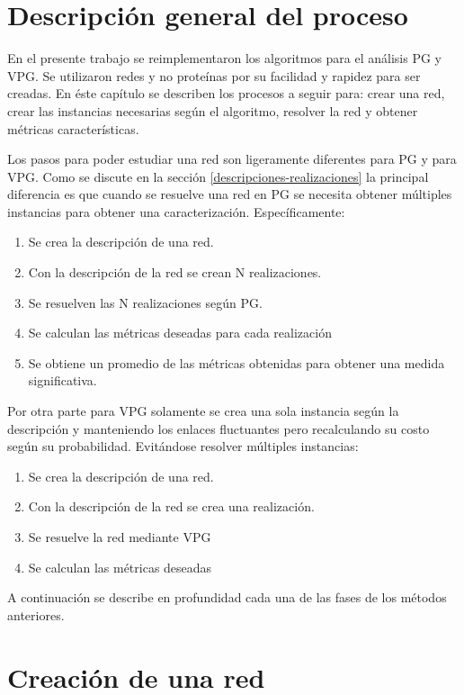 \section{Descripción general del proceso} \label{seccion-descripcion}
En el presente trabajo se reimplementaron los algoritmos para el análisis PG y VPG. Se utilizaron redes y no proteínas por su facilidad y rapidez para ser creadas. En éste capítulo se describen los procesos a seguir para: crear una red, crear las instancias necesarias según el algoritmo, resolver la red y obtener métricas características.

Los pasos para poder estudiar una red son ligeramente diferentes para PG y para VPG. Como se discute en la sección \ref{descripciones-realizaciones} la principal diferencia es que cuando se resuelve una red en PG se necesita obtener múltiples instancias para obtener una caracterización. Específicamente:

\begin{enumerate}
	\item Se crea la descripción de una red.
	\item Con la descripción de la red se crean N realizaciones.
	\item Se resuelven las N realizaciones según PG.
	\item Se calculan las métricas deseadas para cada realización
	\item Se obtiene un promedio de las métricas obtenidas para obtener una medida significativa.
\end{enumerate}

Por otra parte para VPG solamente se crea una sola instancia según la descripción y manteniendo los enlaces fluctuantes pero recalculando su costo según su probabilidad. Evitándose resolver múltiples instancias:

\begin{enumerate}
  \item Se crea la descripción de una red.
  \item Con la descripción de la red se crea una realización.
  \item Se resuelve la red mediante VPG
  \item Se calculan las métricas deseadas
\end{enumerate}

A continuación se describe en profundidad cada una de las fases de los métodos anteriores.

\section{Creación de una red}

